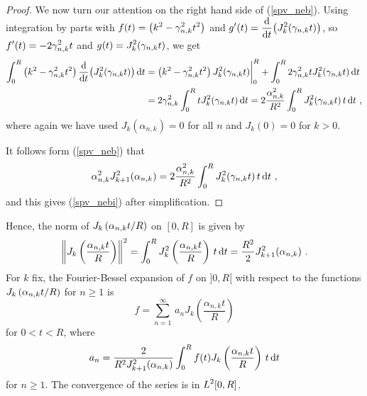 \begin{proof}
We now turn our attention on the right hand side of (\ref{spv_neb}).
Using integration by parts with
$\DS f(t) = \left(k^2 - \gamma_{n,k}^2 t^2\right)$
and $\DS g'(t) = \dfdx{\left( J_k^2(\gamma_{n,k}t)\right)}{t}$,
so $\DS f'(t) = - 2\gamma_{n,k}^2 t$ and
$\DS g(t) = J_k^2(\gamma_{n,k}t)$, we get
\begin{align*}
\int_0^R \left(k^2 - \gamma_{n,k}^2 t^2\right)
\dfdx{\left( J_k^2(\gamma_{n,k}t)\right)}{t} \dx{t} 
&= \left(k^2 - \gamma_{n,k}^2 t^2\right) J_k^2(\gamma_{n,k}t)\bigg|_0^R
+ \int_0^R 2\gamma_{n,k}^2 t J_k^2(\gamma_{n,k}t) \dx{t} \\
&= 2\gamma_{n,k}^2 \int_0^R t J_k^2(\gamma_{n,k}t) \dx{t}
= 2\frac{\alpha_{n,k}^2}{R^2 } \int_0^R J_k^2(\gamma_{n,k}t)\, t \dx{t} \ ,
\end{align*}
where again we have used $J_k(\alpha_{n,k})=0$ for all $n$ and
$J_k(0) = 0$ for $k>0$.

It follows form (\ref{spv_neb}) that
\[
\alpha_{n,k}^2 J_{k+1}^2(\alpha_{n,k}) = 
2\frac{\alpha_{n,k}^2}{R^2 } \int_0^R J_k^2(\gamma_{n,k}t)\, t \dx{t} \ ,
\]
and this gives (\ref{spv_nebi}) after simplification.
\end{proof}

Hence, the norm of
$\DS J_k\left(\alpha_{n,k} t / R\right)$ on $[0,R]$ is
given by
\[
\left\| J_k\left(\frac{\alpha_{n,k} t}{R}\right) \right\|^2
= \int_0^R J_k^2\left(\frac{\alpha_{n,k} t}{R}\right) \, t \dx{t} =
\frac{R^2}{2} J_{k+1}^2 (\alpha_{n,k}) \ .
\]
For $k$ fix, the Fourier-Bessel expansion of $f$ on $]0,R[$ with
respect to the functions
$\DS J_k\left(\alpha_{n,k} t/R\right)$ for $n \geq 1$ is
\[
f = \sum_{n=1}^{\infty}\, a_{n}
J_k\left(\frac{\alpha_{n,k} t}{R}\right)
\]
for $0 < t < R$, where
\[
a_n = \frac{2}{R^2 J_{k+1}^2(\alpha_{n,k})} \int_0^R f(t)
J_k\left(\frac{\alpha_{n,k} t}{R}\right) \, t \dx{t}
\]
for $n \geq 1$.  The convergence of the series is in $\DS L^2[0,R]$.

